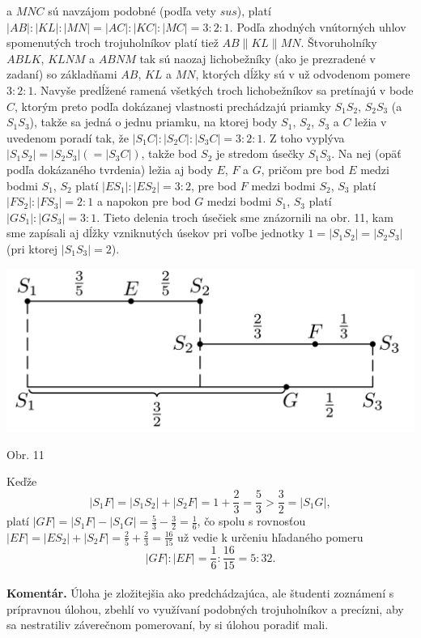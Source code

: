 \documentclass[11pt,a4paper,oneside,final]{book}
\newcommand{\kom}{\textbf{Komentár.} }
\begin{document}
a $MNC$ sú navzájom podobné (podľa vety $sus$), platí $|AB| : |KL| : |MN| = |AC| : |KC| : |MC| = 3 : 2 : 1$. Podľa zhodných vnútorných uhlov spomenutých troch trojuholníkov platí tiež $AB \parallel KL \parallel MN$. Štvoruholníky $ABLK$, $KLNM$ a $ABNM$ tak sú naozaj lichobežníky (ako je prezradené v zadaní) so základňami $AB$, $KL$ a $MN$, ktorých dĺžky sú v už odvodenom pomere $3 : 2 : 1$. Navyše predĺžené ramená všetkých troch lichobežníkov sa pretínajú v bode $C$, ktorým preto podľa dokázanej vlastnosti prechádzajú priamky $S_1 S_2$, $S_2 S_3$ (a $S_1 S_3$), takže sa jedná o jednu priamku, na ktorej body $S_1$, $S_2$, $S_3$ a $C$ ležia v uvedenom poradí tak, že $|S_1 C| : |S_2 C| : |S_3 C| = 3 : 2 : 1$. Z toho vyplýva $|S_1 S_2 | = |S_2 S_3 | (= |S_3 C|)$, takže bod $S_2$ je stredom úsečky $S_1 S_3$. Na nej (opäť podľa dokázaného tvrdenia) ležia aj body $E$, $F$ a $G$, pričom pre bod $E$ medzi bodmi $S_1$, $S_2$ platí $|ES_1 | : |ES_2 | = 3 : 2$, pre bod $F$ medzi bodmi $S_2$, $S_3$ platí $|FS_2| : |FS_3| = 2 : 1$ a napokon pre bod $G$ medzi bodmi $S_1$, $S_3$ platí $|GS_1| : |GS_3 | = 3 : 1$. Tieto delenia troch úsečiek sme znázornili na obr. 11, kam sme zapísali aj dĺžky vzniknutých úsekov pri voľbe jednotky $1 = |S_1 S_2 | = |S_2 S_3 |$ (pri ktorej $|S_1 S_3 | = 2$).
\begin{center}
\includegraphics{66D53}

Obr. 11
\end{center}
Keďže
$$|S_1 F| = |S_1 S_2 | + |S_2 F| = 1 +\frac{2}{3}=\frac{5}{3}>\frac{3}{2}= |S_1 G|,$$
platí $|GF| = |S_1 F| - |S_1 G| =\frac{5}{3} -\frac{3}{2}=\frac{1}{6}$, čo spolu s rovnosťou $|EF| = |ES_2 | + |S_2 F|=\frac{2}{5}+\frac{2}{3}=\frac{16}{15}$ už vedie k určeniu hľadaného pomeru
$$|GF| : |EF| =\frac{1}{6}:\frac{16}{15}= 5 : 32.$$
\\
\kom Úloha je zložitejšia ako predchádzajúca, ale študenti zoznámení s prípravnou úlohou, zbehlí vo využívaní podobných trojuholníkov a precízni, aby sa nestratiliv záverečnom pomerovaní, by si úlohou poradiť mali.
\end{document}
